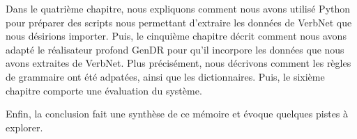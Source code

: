 Dans le quatrième chapitre, nous expliquons comment nous avons utilisé Python pour préparer des scripts nous permettant d'extraire les données de VerbNet que nous désirions importer. Puis, le cinquième chapitre décrit comment nous avons adapté le réalisateur profond GenDR pour qu'il incorpore les données que nous avons extraites de VerbNet. Plus précisément, nous décrivons comment les règles de grammaire ont été adpatées, ainsi que les dictionnaires. Puis, le sixième chapitre comporte une évaluation du système.

Enfin, la conclusion fait une synthèse de ce mémoire et évoque quelques pistes à explorer.